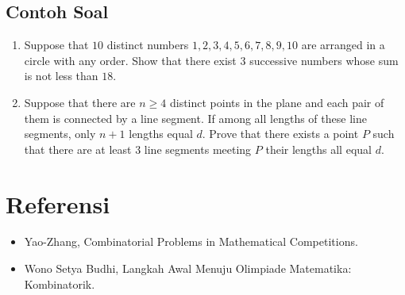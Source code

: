 \documentclass[12pt]{scrartcl}
\begin{document}
\subsection{Contoh Soal}
\begin{enumerate}
\item Suppose that $10$ distinct numbers $1, 2, 3, 4, 5, 6, 7,8, 9, 10$ are arranged in a circle with any order. Show that there exist $3$ successive numbers whose sum is not less than $18$.

\item Suppose that there are $n \ge 4$ distinct points in the plane and each pair of them is connected by a line segment. If among all lengths of these line segments, only $n + 1$ lengths equal $d$. Prove that there exists a point $P$ such that there are at least $3$ line segments meeting $P$ their lengths all equal $d$.

\end{enumerate}
\section{Referensi}
\begin{itemize}
    \item Yao-Zhang, Combinatorial Problems in Mathematical Competitions.
    \item Wono Setya Budhi, Langkah Awal Menuju Olimpiade Matematika: Kombinatorik.
\end{itemize}
\end{document}
